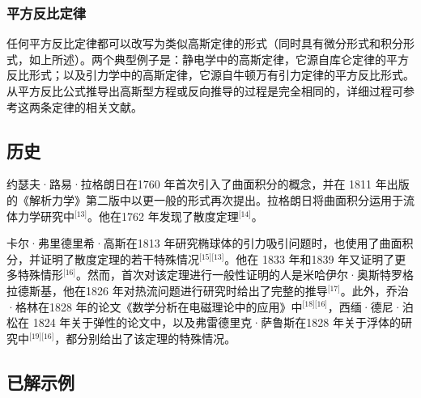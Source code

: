 \subsubsection{平方反比定律}
任何平方反比定律都可以改写为类似高斯定律的形式（同时具有微分形式和积分形式，如上所述）。两个典型例子是：静电学中的高斯定律，它源自库仑定律的平方反比形式；以及引力学中的高斯定律，它源自牛顿万有引力定律的平方反比形式。从平方反比公式推导出高斯型方程或反向推导的过程是完全相同的，详细过程可参考这两条定律的相关文献。
\subsection{历史}
约瑟夫·路易·拉格朗日在1760 年首次引入了曲面积分的概念，并在 1811 年出版的《解析力学》第二版中以更一般的形式再次提出。拉格朗日将曲面积分运用于流体力学研究中\(^\text{[13]}\)。他在1762 年发现了散度定理\(^\text{[14]}\)。

卡尔·弗里德里希·高斯在1813 年研究椭球体的引力吸引问题时，也使用了曲面积分，并证明了散度定理的若干特殊情况\(^\text{[15][13]}\)。他在 1833 年和1839 年又证明了更多特殊情形\(^\text{[16]}\)。然而，首次对该定理进行一般性证明的人是米哈伊尔·奥斯特罗格拉德斯基，他在1826 年对热流问题进行研究时给出了完整的推导\(^\text{[17]}\)。此外，乔治·格林在1828 年的论文《数学分析在电磁理论中的应用》中\(^\text{[18][16]}\)，西缅·德尼·泊松在 1824 年关于弹性的论文中，以及弗雷德里克·萨鲁斯在1828 年关于浮体的研究中\(^\text{[19][16]}\)，都分别给出了该定理的特殊情况。
\subsection{已解示例}
